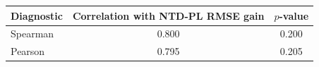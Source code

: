 \begin{tabular}{@{}l c c@{}}
\toprule
Diagnostic & Correlation with NTD-PL RMSE gain & \(p\)-value \\
\midrule
Spearman & 0.800 & 0.200\\
Pearson & 0.795 & 0.205\\
\bottomrule
\end{tabular}
